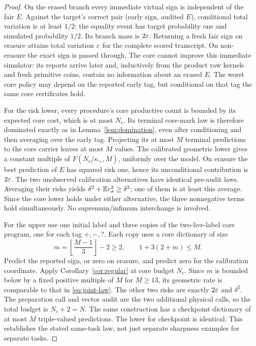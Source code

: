 \begin{proof}
On the erased branch every immediate virtual sign is independent of the fair $E$. Against the target's correct pair (early sign, audited $E$), conditional total variation is at least $1/2$: the equality event has target probability one and simulated probability $1/2$. Its branch mass is $2\varepsilon$. Returning a fresh fair sign on erasure attains total variation $\varepsilon$ for the complete scored transcript. On non-erasure the exact sign is passed through. The core cannot improve this immediate simulator: its reports arrive later and, inductively from the product raw kernels and fresh primitive coins, contain no information about an erased $E$. The worst core policy may depend on the reported early tag, but conditional on that tag the same core certificates hold.

For the risk lower, every procedure's core productive count is bounded by its expected core cost, which is at most $N_c$. Its terminal core-mark law is therefore dominated exactly as in Lemma~\ref{lem:domination}, even after conditioning and then averaging over the early tag. Projecting its at most $M$ terminal predictions to the core carrier leaves at most $M$ values. The calibrated geometric lower gives a constant multiple of $F(N_c/\kappa_+,M)$, uniformly over the model. On erasure the best prediction of $E$ has squared risk one, hence its unconditional contribution is $2\varepsilon$. The two unobserved calibration alternatives have identical pre-audit laws. Averaging their risks yields $\delta^2+\mathbb E r_\sigma^2\ge\delta^2$; one of them is at least this average. Since the core lower holds under either alternative, the three nonnegative terms hold simultaneously. No supremum/infimum interchange is involved.

For the upper use one initial label and three copies of the two-live-label core program, one for each tag $+, -,\mathtt{?}$. Each copy uses a core dictionary of size
\[
 m=\left\lfloor\frac{M-1}{3}\right\rfloor-2\ge2,
 \qquad 1+3(2+m)\le M.
\]
Predict the reported sign, or zero on erasure, and predict zero for the calibration coordinate. Apply Corollary~\ref{cor:regular} at core budget $N_c$. Since $m$ is bounded below by a fixed positive multiple of $M$ for $M\ge13$, its geometric rate is comparable to that in \eqref{eq:joint-law}. The other two risks are exactly $2\varepsilon$ and $\delta^2$. The preparation call and vector audit are the two additional physical calls, so the total budget is $N_c+2=N$. The same construction has a checkpoint dictionary of at most $M$ triple-valued predictions. The lower for checkpoint is identical. This establishes the stated same-task law, not just separate sharpness examples for separate tasks.
\end{proof}
